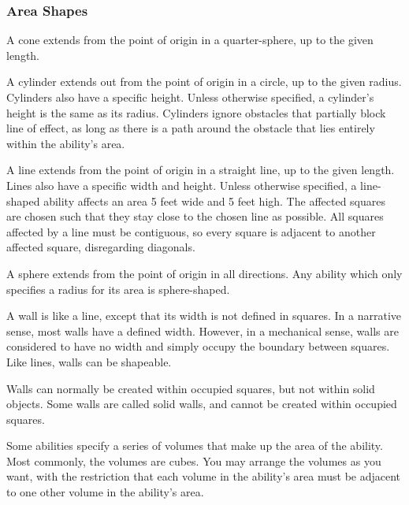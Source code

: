         \subsubsection{Area Shapes}\label{Area Shapes}

             A cone extends from the point of origin in a quarter-sphere, up to the given length.

             A cylinder extends out from the point of origin in a circle, up to the given radius.
            Cylinders also have a specific height.
            Unless otherwise specified, a cylinder's height is the same as its radius.
            Cylinders ignore obstacles that partially block line of effect, as long as there is a path around the obstacle that lies entirely within the ability's area.

             A line extends from the point of origin in a straight line, up to the given length.
            Lines also have a specific width and height.
            Unless otherwise specified, a line-shaped ability affects an area 5 feet wide and 5 feet high.
            The affected squares are chosen such that they stay close to the chosen line as possible.
            All squares affected by a line must be contiguous, so every square is adjacent to another affected square, disregarding diagonals.

             A sphere extends from the point of origin in all directions.
            Any ability which only specifies a radius for its area is sphere-shaped.

             A wall is like a line, except that its width is not defined in squares.
            In a narrative sense, most walls have a defined width.
            However, in a mechanical sense, walls are considered to have no width and simply occupy the boundary between squares.
            Like lines, walls can be shapeable.

            Walls can normally be created within occupied squares, but not within solid objects.
            Some walls are called solid walls, and cannot be created within occupied squares.

             Some abilities specify a series of volumes that make up the area of the ability.
            Most commonly, the volumes are cubes.
            You may arrange the volumes as you want, with the restriction that each volume in the ability's area must be adjacent to one other volume in the ability's area.

